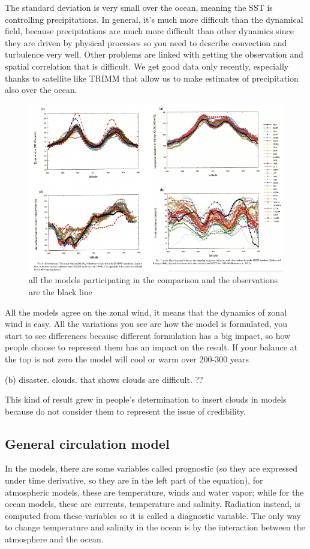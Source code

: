 The standard deviation is very small over the ocean, meaning the SST is controlling precipitations.
In general, it's much more difficult than the dynamical field, because precipitations are much more difficult than other dynamics since they are driven by physical processes so you need to describe convection and turbulence very well. Other problems are linked with getting the observation and spatial correlation that is difficult. We get good data only recently, especially thanks to satellite like TRIMM that allow us to make estimates of precipitation also over the ocean.


\begin{figure}[htp!]
	\centering
	\includegraphics[width=0.4\linewidth]{uploads/Screenshot 2024-11-20 210633.png}
	\caption{all the models participating in the comparison and the observations are the black line}
	\label{fig:enter-label}
\end{figure}
All the models agree on the zonal wind, it means that the dynamics of zonal wind is easy. All the variations you see are how the model is formulated, you start to see differences because different formulation has a big impact, so how people choose to represent them has an impact on the result.
If your balance at the top is not zero the model will cool or warm over 200-300 years

(b) disaster. clouds. that shows clouds are difficult. ??



This kind of result grew in people's determination to insert clouds in models because do not consider them to represent the issue of credibility.


\subsection{General circulation model }
In the models, there are some variables called prognostic (so they are expressed under time derivative, so they are in the left part of the equation), for atmospheric models, these are temperature, winds and water vapor; while for the ocean models, these are currents, temperature and salinity. Radiation instead, is computed from these variables so it is called a diagnostic variable.
The only way to change temperature and salinity in the ocean is by the interaction between the atmosphere and the ocean.

